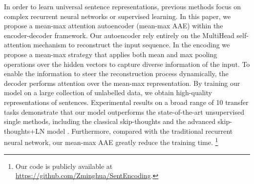 In order to learn universal sentence representations, previous methods focus on complex recurrent neural networks or supervised learning. In this paper, we propose a mean-max attention autoencoder (mean-max AAE) within the encoder-decoder framework. Our autoencoder rely entirely on the MultiHead self-attention mechanism to reconstruct the input sequence. In the encoding we propose a mean-max strategy that applies both mean and max pooling operations over the hidden vectors to capture diverse information of the input. To enable the information to steer the reconstruction process dynamically, the decoder performs attention over the mean-max representation. By training our model on a large collection of unlabelled data, we obtain high-quality representations of sentences. Experimental results on a broad range of 10 transfer tasks demonstrate that our model outperforms the state-of-the-art unsupervised single methods, including the classical skip-thoughts \cite{kiros2015skip} and the advanced skip-thoughts+LN model \cite{ba2016layer}. Furthermore, compared with the traditional recurrent neural network, our mean-max AAE greatly reduce the training time. \footnote{Our code is publicly available at \url{https://github.com/Zminghua/SentEncoding}.}

